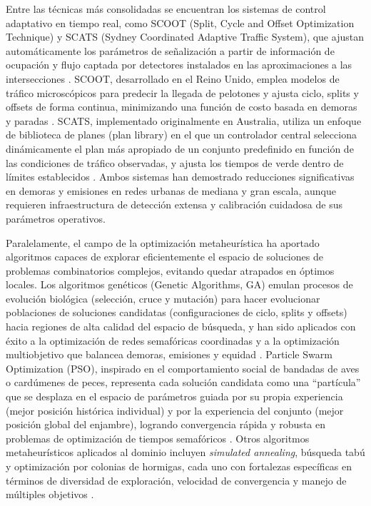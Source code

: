 Entre las técnicas más consolidadas se encuentran los sistemas de control adaptativo en tiempo real, como SCOOT (Split, Cycle and Offset Optimization Technique) y SCATS (Sydney Coordinated Adaptive Traffic System), que ajustan automáticamente los parámetros de señalización a partir de información de ocupación y flujo captada por detectores instalados en las aproximaciones a las intersecciones \cite{hunt1982scoot,sims1980scats}. SCOOT, desarrollado en el Reino Unido, emplea modelos de tráfico microscópicos para predecir la llegada de pelotones y ajusta ciclo, splits y offsets de forma continua, minimizando una función de costo basada en demoras y paradas \cite{hunt1982scoot,papageorgiou2003review}. SCATS, implementado originalmente en Australia, utiliza un enfoque de biblioteca de planes (plan library) en el que un controlador central selecciona dinámicamente el plan más apropiado de un conjunto predefinido en función de las condiciones de tráfico observadas, y ajusta los tiempos de verde dentro de límites establecidos \cite{sims1980scats,gartner2001arterial}. Ambos sistemas han demostrado reducciones significativas en demoras y emisiones en redes urbanas de mediana y gran escala, aunque requieren infraestructura de detección extensa y calibración cuidadosa de sus parámetros operativos.

Paralelamente, el campo de la optimización metaheurística ha aportado algoritmos capaces de explorar eficientemente el espacio de soluciones de problemas combinatorios complejos, evitando quedar atrapados en óptimos locales. Los algoritmos genéticos (Genetic Algorithms, GA) emulan procesos de evolución biológica (selección, cruce y mutación) para hacer evolucionar poblaciones de soluciones candidatas (configuraciones de ciclo, splits y offsets) hacia regiones de alta calidad del espacio de búsqueda, y han sido aplicados con éxito a la optimización de redes semafóricas coordinadas y a la optimización multiobjetivo que balancea demoras, emisiones y equidad \cite{ceylan2004traffic,papageorgiou2003review}. Particle Swarm Optimization (PSO), inspirado en el comportamiento social de bandadas de aves o cardúmenes de peces, representa cada solución candidata como una ``partícula'' que se desplaza en el espacio de parámetros guiada por su propia experiencia (mejor posición histórica individual) y por la experiencia del conjunto (mejor posición global del enjambre), logrando convergencia rápida y robusta en problemas de optimización de tiempos semafóricos \cite{kennedy1995particle,li2016pso,goncalo2022tuning}. Otros algoritmos metaheurísticos aplicados al dominio incluyen \emph{simulated annealing}, búsqueda tabú y optimización por colonias de hormigas, cada uno con fortalezas específicas en términos de diversidad de exploración, velocidad de convergencia y manejo de múltiples objetivos \cite{papageorgiou2003review}.

